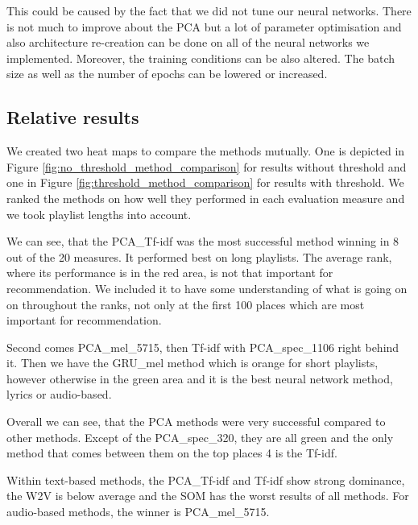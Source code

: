 This could be caused by the fact that we did not tune our neural networks. There is not much to improve about the PCA but a lot of parameter optimisation and also architecture re-creation can be done on all of the neural networks we implemented. Moreover, the training conditions can be also altered. The batch size as well as the number of epochs can be lowered or increased. 

\subsection{Relative results}\label{ssec:relative_comparison}

We created two heat maps to compare the methods mutually. One is depicted in Figure \ref{fig:no_threshold_method_comparison} for results without threshold and one in Figure \ref{fig:threshold_method_comparison} for results with threshold. We ranked the methods on how well they performed in each evaluation measure and we took playlist lengths into account. 

We can see, that the PCA\_Tf-idf was the most successful method winning in 8 out of the 20 measures. It performed best on long playlists. The average rank, where its performance is in the red area, is not that important for recommendation. We included it to have some understanding of what is going on on throughout the ranks, not only at the first 100 places which are most important for recommendation.

Second comes PCA\_mel\_5715, then Tf-idf with PCA\_spec\_1106 right behind it. Then we have the GRU\_mel method which is orange for short playlists, however otherwise in the green area and it is the best neural network method, lyrics or audio-based. 

Overall we can see, that the PCA methods were very successful compared to other methods. Except of the PCA\_spec\_320, they are all green and the only method that comes between them on the top places 4 is the Tf-idf. 

Within text-based methods, the PCA\_Tf-idf and Tf-idf show strong dominance, the W2V is below average and the SOM has the worst results of all methods. For audio-based methods, the winner is PCA\_mel\_5715. \\

